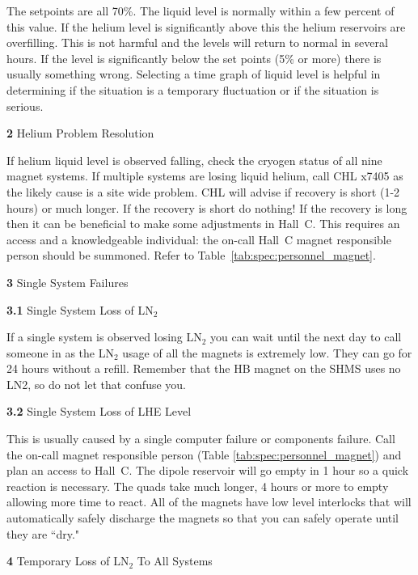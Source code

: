 {\begin{description}
\item{}\hskip0.3in The setpoints are all 70\%.  The liquid
level is normally within a few percent of this value.  If
the helium level is significantly above this
the helium reservoirs are overfilling.  This is not harmful and the
levels will return to normal in several hours.  If the level is
significantly below the set points (5\% or more) there is usually
something wrong.  Selecting a time graph of liquid level is helpful in
determining if the situation is a temporary fluctuation or if the
situation is serious.
\item{\bf 2}\hskip0.1in Helium Problem Resolution
\item{}\hskip0.3in If helium liquid level is observed falling, check the cryogen status of all nine magnet
systems.  If multiple systems are losing liquid helium,  call CHL x7405 as the
likely cause is a site wide problem.  CHL will advise if recovery is
short (1-2 hours) or much longer.  If the recovery is short do nothing!
If the recovery is long then it can be beneficial to make some
adjustments in Hall~C.  This requires an access and a knowledgeable
individual: the on-call Hall~C magnet responsible person
should be summoned. Refer to Table~\ref{tab:spec:personnel_magnet}.
\item{\bf 3}\hskip0.1in Single System Failures
\item{\bf 3.1}\hskip0.1in Single System Loss of LN$_2$
\item{}\hskip0.3in If a single system is observed losing LN$_2$ you can
wait until
the next day to call someone in as the LN$_2$ usage of all the magnets
is extremely low.  They can go for 24 hours without a refill. Remember that the
HB magnet on the SHMS uses no LN2, so do not let that confuse you.
\item{\bf 3.2}\hskip0.1in Single System Loss of LHE Level
\item{}\hskip0.3in This is usually caused by a single computer failure or
components failure.  Call the on-call magnet responsible person (Table \ref{tab:spec:personnel_magnet})
and plan an access to Hall~C. The dipole reservoir will go empty in 1 hour so a quick reaction is
necessary.  The quads take much longer, 4 hours or more to empty
allowing more time to react.  All of the magnets have low level
interlocks that will automatically safely discharge the magnets 
so that you can safely operate until they are ``dry."
\item{\bf 4}\hskip0.1in Temporary Loss of LN$_2$ To All Systems

\end{description}}
